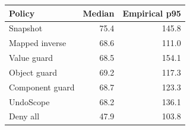 \begin{tabular}{@{}lrr@{}}\toprule Policy & Median & Empirical p95\\\midrule
Snapshot & 75.4 & 145.8\\
Mapped inverse & 68.6 & 111.0\\
Value guard & 68.5 & 154.1\\
Object guard & 69.2 & 117.3\\
Component guard & 68.7 & 123.3\\
UndoScope & 68.2 & 136.1\\
Deny all & 47.9 & 103.8\\
\bottomrule\end{tabular}